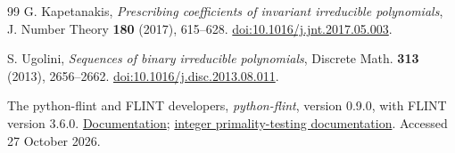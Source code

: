 \documentclass[11pt]{article}
\theoremstyle{definition}
\theoremstyle{remark}
\begin{document}
\begin{thebibliography}{99}
G. Kapetanakis,
\emph{Prescribing coefficients of invariant irreducible polynomials},
J. Number Theory \textbf{180} (2017), 615--628.
\href{https://doi.org/10.1016/j.jnt.2017.05.003}{doi:10.1016/j.jnt.2017.05.003}.

S. Ugolini,
\emph{Sequences of binary irreducible polynomials},
Discrete Math. \textbf{313} (2013), 2656--2662.
\href{https://doi.org/10.1016/j.disc.2013.08.011}{doi:10.1016/j.disc.2013.08.011}.

The python-flint and FLINT developers,
\emph{python-flint}, version 0.9.0, with FLINT version 3.6.0.
\href{https://python-flint.readthedocs.io/}{Documentation};
\href{https://flintlib.org/doc/fmpz.html}{integer primality-testing documentation}.
Accessed 27 October 2026.

\end{thebibliography}
\end{document}
